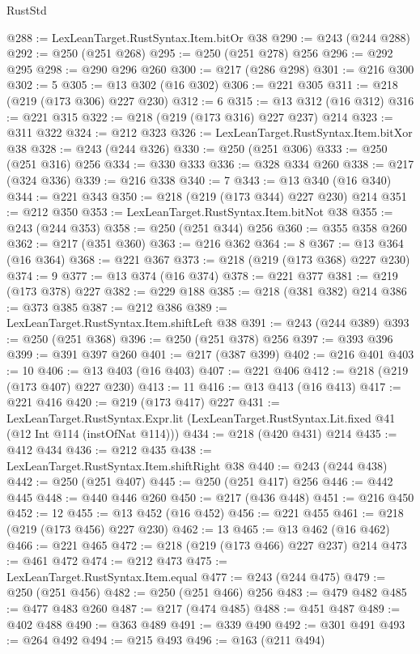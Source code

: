 \begin{lexlean}{RustStd}
\begin{coremodule}
@288 := LexLeanTarget.RustSyntax.Item.bitOr @38
@290 := @243 (@244 @288)
@292 := @250 (@251 @268)
@295 := @250 (@251 @278) @256
@296 := @292 @295
@298 := @290 @296 @260
@300 := @217 (@286 @298)
@301 := @216 @300
@302 := 5
@305 := @13 @302 (@16 @302)
@306 := @221 @305
@311 := @218 (@219 (@173 @306) @227 @230)
@312 := 6
@315 := @13 @312 (@16 @312)
@316 := @221 @315
@322 := @218 (@219 (@173 @316) @227 @237) @214
@323 := @311 @322
@324 := @212 @323
@326 := LexLeanTarget.RustSyntax.Item.bitXor @38
@328 := @243 (@244 @326)
@330 := @250 (@251 @306)
@333 := @250 (@251 @316) @256
@334 := @330 @333
@336 := @328 @334 @260
@338 := @217 (@324 @336)
@339 := @216 @338
@340 := 7
@343 := @13 @340 (@16 @340)
@344 := @221 @343
@350 := @218 (@219 (@173 @344) @227 @230) @214
@351 := @212 @350
@353 := LexLeanTarget.RustSyntax.Item.bitNot @38
@355 := @243 (@244 @353)
@358 := @250 (@251 @344) @256
@360 := @355 @358 @260
@362 := @217 (@351 @360)
@363 := @216 @362
@364 := 8
@367 := @13 @364 (@16 @364)
@368 := @221 @367
@373 := @218 (@219 (@173 @368) @227 @230)
@374 := 9
@377 := @13 @374 (@16 @374)
@378 := @221 @377
@381 := @219 (@173 @378) @227
@382 := @229 @188
@385 := @218 (@381 @382) @214
@386 := @373 @385
@387 := @212 @386
@389 := LexLeanTarget.RustSyntax.Item.shiftLeft @38
@391 := @243 (@244 @389)
@393 := @250 (@251 @368)
@396 := @250 (@251 @378) @256
@397 := @393 @396
@399 := @391 @397 @260
@401 := @217 (@387 @399)
@402 := @216 @401
@403 := 10
@406 := @13 @403 (@16 @403)
@407 := @221 @406
@412 := @218 (@219 (@173 @407) @227 @230)
@413 := 11
@416 := @13 @413 (@16 @413)
@417 := @221 @416
@420 := @219 (@173 @417) @227
@431 := LexLeanTarget.RustSyntax.Expr.lit
    (LexLeanTarget.RustSyntax.Lit.fixed @41 (@12 Int @114 (instOfNat @114)))
@434 := @218 (@420 @431) @214
@435 := @412 @434
@436 := @212 @435
@438 := LexLeanTarget.RustSyntax.Item.shiftRight @38
@440 := @243 (@244 @438)
@442 := @250 (@251 @407)
@445 := @250 (@251 @417) @256
@446 := @442 @445
@448 := @440 @446 @260
@450 := @217 (@436 @448)
@451 := @216 @450
@452 := 12
@455 := @13 @452 (@16 @452)
@456 := @221 @455
@461 := @218 (@219 (@173 @456) @227 @230)
@462 := 13
@465 := @13 @462 (@16 @462)
@466 := @221 @465
@472 := @218 (@219 (@173 @466) @227 @237) @214
@473 := @461 @472
@474 := @212 @473
@475 := LexLeanTarget.RustSyntax.Item.equal
@477 := @243 (@244 @475)
@479 := @250 (@251 @456)
@482 := @250 (@251 @466) @256
@483 := @479 @482
@485 := @477 @483 @260
@487 := @217 (@474 @485)
@488 := @451 @487
@489 := @402 @488
@490 := @363 @489
@491 := @339 @490
@492 := @301 @491
@493 := @264 @492
@494 := @215 @493
@496 := @163 (@211 @494)

\end{coremodule}
\end{lexlean}
